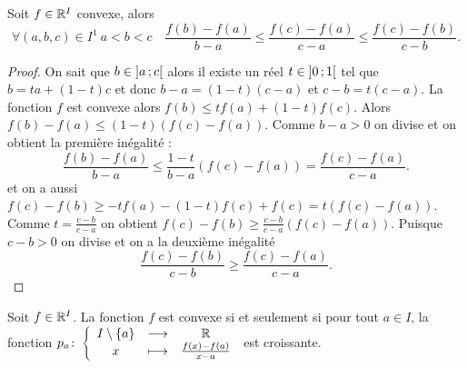 \begin{theo}\label{theo:pentes}
  Soit \(f \in \mathbb{R}^I\) convexe, alors
  \begin{equation}
    \forall (a,b,c) \in I^1 \ a<b<c \quad \frac{f(b)-f(a)}{b-a} \leqslant
    \frac{f(c)-f(a)}{c-a} \leqslant \frac{f(c)-f(b)}{c-b}.
  \end{equation}
\end{theo}
\begin{proof}
  On sait que \(b \in \left] a \, ; {} c \right[\) alors il existe un réel \(t \in
  \left] 0 \, ; {} 1 \right[\) tel que \(b=ta+(1-t)c\) et donc \(b-a=(1-t)(c-a)\) et
  \(c-b=t(c-a)\). La fonction \(f\) est convexe alors \(f(b) \leqslant
  tf(a)+(1-t)f(c)\). Alors \(f(b)-f(a) \leqslant (1-t)(f(c)-f(a))\). Comme \(b-a
  >0\) on divise et on obtient la première inégalité :
  \begin{equation}
    \frac{f(b)-f(a)}{b-a} \leqslant
    \frac{1-t}{b-a}(f(c)-f(a))=\frac{f(c)-f(a)}{c-a}.
  \end{equation}
  et on a aussi \(f(c)-f(b) \geqslant -tf(a)-(1-t)f(c)+f(c) = t(f(c)-f(a))\).
  Comme \(t=\frac{c-b}{c-a}\) on obtient \(f(c)-f(b) \geqslant
  \frac{c-b}{c-a}(f(c)-f(a))\). Puisque \(c-b>0\) on divise et on a la deuxième
  inégalité
  \begin{equation}
    \frac{f(c)-f(b)}{c-b} \geqslant \frac{f(c)-f(a)}{c-a}.
  \end{equation}
\end{proof}
\begin{theo}
  Soit \(f \in \mathbb{R}^I\). La fonction \(f\) est convexe si et seulement si pour
  tout \(a \in I\), la fonction
  \(p_a\colon\left\{\begin{array}{ccc}I\setminus\{a\} & \longrightarrow &\mathbb{R}\\x & \longmapsto & \frac{f(x)-f(a)}{x-a}\end{array}\right.\) est
  croissante.
\end{theo}
